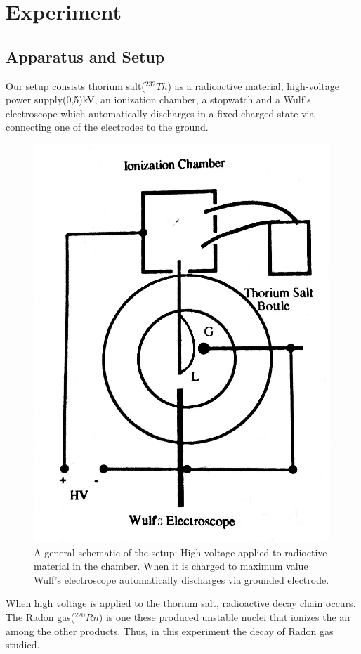 \documentclass[reprint,amsmath,aps,nofootinbib,english]{revtex4-2}
\begin{document}
\section{Experiment}
\subsection{Apparatus and Setup}
Our setup consists thorium salt($^{232}Th$) as a radioactive material, high-voltage power supply(0,5)kV, an ionization chamber, a stopwatch and a Wulf's electroscope which automatically discharges in a fixed charged state via connecting one of the electrodes to the ground.
\begin{figure}[H]
  \includegraphics[width=0.75\columnwidth]{graphics/app.png}
  \caption{A general schematic of the setup: High voltage applied to radioctive material in the chamber. When it is charged to maximum value Wulf's electroscope automatically discharges via grounded electrode. \cite{Gulmez}}
   \label{fig:app}
\end{figure}
When high voltage is applied to the thorium salt, radioactive decay chain occurs. The Radon gas($^{220}Rn$) is one these produced unstable nuclei that ionizes the air among the other products. Thus, in this experiment 
the decay of Radon gas studied.
\end{document}
